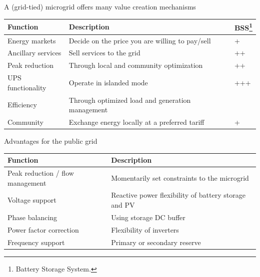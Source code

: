 \begin{frame}{A (grid-tied) microgrid offers many value creation mechanisms}
\begin{center}
  
  \begin{tabularx}{\textwidth}{lXl}
    \toprule
    Function & Description & BSS\footnote{Battery Storage System.} \\
    \midrule
    Energy markets & Decide on the price you are willing to pay/sell & + \\
    Ancillary services & Sell services to the grid & ++ \\
    Peak reduction & Through local and community optimization & ++ \\
    UPS functionality & Operate in islanded mode & +++ \\
    Efficiency & Through optimized load and generation management & \\
    Community & Exchange energy locally at a preferred tariff & + \\
    \bottomrule
  \end{tabularx}
\end{center}

\end{frame}

\begin{frame}{Advantages for the public grid}
\begin{center}
  
  \begin{tabularx}{\textwidth}{Xl}
    \toprule
    Function & Description \\
    \midrule
    Peak reduction / flow management & Momentarily set constraints to the microgrid \\
    Voltage support & Reactive power flexibility of battery storage and PV \\
    Phase balancing & Using storage DC buffer \\
    Power factor correction & Flexibility of inverters \\
    Frequency support & Primary or secondary reserve \\
    \bottomrule
    \end{tabularx}
\end{center}

\end{frame}



